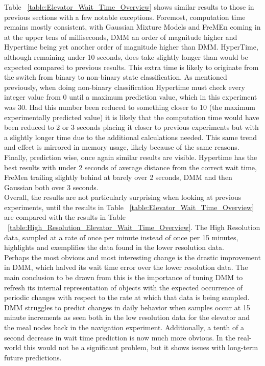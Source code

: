 Table ~\ref{table:Elevator_Wait_Time_Overview} shows similar results to those
in previous sections with a few notable exceptions. Foremost, computation time
remains mostly consistent, with Gaussian Mixture Models and FreMEn coming in at
the upper tens of milliseconds, DMM an order of magnitude higher and
Hypertime being yet another order of magnitude higher than DMM. HyperTime,
although remaining under 10 seconds, does take slightly longer than would
be expected compared to previous results. This extra time is likely to originate
from the switch from binary to non-binary state classification. As mentioned previously,
when doing non-binary classification Hypertime must check every integer value
from 0 until a maximum prediction value, which in this experiment was 30. Had this
number been reduced to something closer to 10 (the maximum experimentally
predicted value) it is likely that the computation time would have been reduced to
2 or 3 seconds placing it closer to previous
experiments but with a slightly longer time due to the additional calculations
needed. This same trend and effect is mirrored in memory usage, likely because of the same reasons.
Finally, prediction wise, once again
similar results are visible. Hypertime has the best results with under 2
seconds of average distance from the correct wait time, FreMen
trailing slightly behind at barely over 2 seconds, DMM and then Gaussian both over 3 seconds. \\

Overall, the results are not particularly surprising when looking at previous
experiments, until the results in Table
~\ref{table:Elevator_Wait_Time_Overview} are compared with the results in Table
~\ref{table:High_Resolution_Elevator_Wait_Time_Overview}. The High Resolution
data, sampled at a rate of once per minute instead of once per 15 minutes,
highlights and exemplifies the data found in the lower resolution data. \\

Perhaps the most obvious and most interesting change is the drastic improvement
in DMM, which halved its wait time error over the lower resolution data.
The main conclusion to be drawn from this is the importance of tuning DMM
to refresh its internal representation of objects with the expected occurrence
of periodic changes with respect to the rate at which that data is being
sampled. DMM struggles to predict changes in daily behavior when samples
occur at 15 minute increments as seen both in the low resolution data for the
elevator and the meal nodes back in the navigation experiment.
Additionally, a tenth of a second decrease in wait time prediction is now much more obvious.
In the real-world this would not be a significant problem,
but it shows issues with long-term future predictions.


